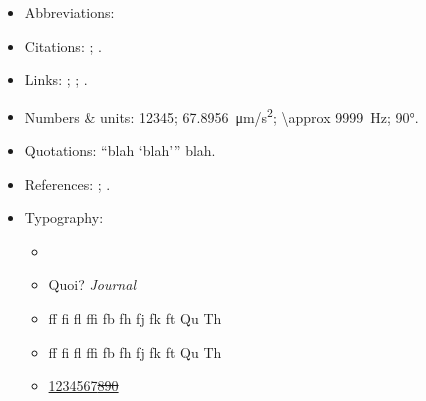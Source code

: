 \documentclass[a4paper, 11pt]{lt_article}
\begin{document}
\begin{itemize}

    \item Abbreviations:
        \eg \ie \cf \etc

    \item Citations:
        \textcite{Bayes};
        \autocite{GravitationalWaves}.

    \item Links:
        ;
        ;
        .

    \item Numbers \& units:
        \num{12345};
        \SI{67.8956}{\um/\s^2};
        \SI{\approx 9999}{Hz};
        \ang{90}.

    \item Quotations:
        \enquote{blah \enquote{blah}} blah.

    \item References:
        ;
        .

    \item Typography:
    \begin{itemize}
        \item \LuaTeX\ \LuaLaTeX
        \item Quoi? \textit{Journal}
        \item ff fi fl ffi fb fh fj fk ft Qu Th
        \item \textsf{ff fi fl ffi fb fh fj fk ft Qu Th}
        \item \uline{1234567\sout{890}}
    \end{itemize}

\end{itemize}

\begin{highlight}
    \blindtext
\end{highlight}

\end{document}
